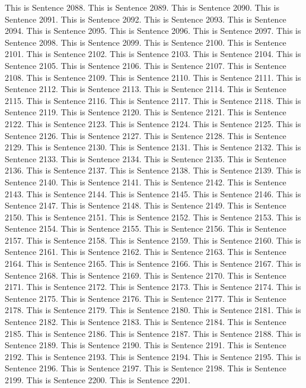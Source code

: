 \documentclass{article}
\begin{document}
This is Sentence 2088.
This is Sentence 2089.
This is Sentence 2090.
This is Sentence 2091.
This is Sentence 2092.
This is Sentence 2093.
This is Sentence 2094.
This is Sentence 2095.
This is Sentence 2096.
This is Sentence 2097.
This is Sentence 2098.
This is Sentence 2099.
This is Sentence 2100.
This is Sentence 2101.
This is Sentence 2102.
This is Sentence 2103.
This is Sentence 2104.
This is Sentence 2105.
This is Sentence 2106.
This is Sentence 2107.
This is Sentence 2108.
This is Sentence 2109.
This is Sentence 2110.
This is Sentence 2111.
This is Sentence 2112.
This is Sentence 2113.
This is Sentence 2114.
This is Sentence 2115.
This is Sentence 2116.
This is Sentence 2117.
This is Sentence 2118.
This is Sentence 2119.
This is Sentence 2120.
This is Sentence 2121.
This is Sentence 2122.
This is Sentence 2123.
This is Sentence 2124.
This is Sentence 2125.
This is Sentence 2126.
This is Sentence 2127.
This is Sentence 2128.
This is Sentence 2129.
This is Sentence 2130.
This is Sentence 2131.
This is Sentence 2132.
This is Sentence 2133.
This is Sentence 2134.
This is Sentence 2135.
This is Sentence 2136.
This is Sentence 2137.
This is Sentence 2138.
This is Sentence 2139.
This is Sentence 2140.
This is Sentence 2141.
This is Sentence 2142.
This is Sentence 2143.
This is Sentence 2144.
This is Sentence 2145.
This is Sentence 2146.
This is Sentence 2147.
This is Sentence 2148.
This is Sentence 2149.
This is Sentence 2150.
This is Sentence 2151.
This is Sentence 2152.
This is Sentence 2153.
This is Sentence 2154.
This is Sentence 2155.
This is Sentence 2156.
This is Sentence 2157.
This is Sentence 2158.
This is Sentence 2159.
This is Sentence 2160.
This is Sentence 2161.
This is Sentence 2162.
This is Sentence 2163.
This is Sentence 2164.
This is Sentence 2165.
This is Sentence 2166.
This is Sentence 2167.
This is Sentence 2168.
This is Sentence 2169.
This is Sentence 2170.
This is Sentence 2171.
This is Sentence 2172.
This is Sentence 2173.
This is Sentence 2174.
This is Sentence 2175.
This is Sentence 2176.
This is Sentence 2177.
This is Sentence 2178.
This is Sentence 2179.
This is Sentence 2180.
This is Sentence 2181.
This is Sentence 2182.
This is Sentence 2183.
This is Sentence 2184.
This is Sentence 2185.
This is Sentence 2186.
This is Sentence 2187.
This is Sentence 2188.
This is Sentence 2189.
This is Sentence 2190.
This is Sentence 2191.
This is Sentence 2192.
This is Sentence 2193.
This is Sentence 2194.
This is Sentence 2195.
This is Sentence 2196.
This is Sentence 2197.
This is Sentence 2198.
This is Sentence 2199.
This is Sentence 2200.
This is Sentence 2201.
\end{document}
